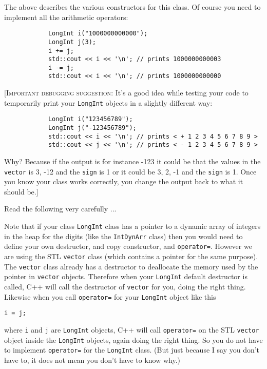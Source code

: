 The above describes the various constructors for this class. Of 
course you need to implement all the arithmetic operators:

\begin{Verbatim}
            LongInt i("1000000000000");
            LongInt j(3);
            i += j;
            std::cout << i << '\n'; // prints 1000000000003
            i -= j;
            std::cout << i << '\n'; // prints 1000000000000
\end{Verbatim}

[\textsc{Important debugging suggestion}: It's a good idea while testing your code
to temporarily print your \verb!LongInt! objects in a slightly different way:

\begin{Verbatim}
            LongInt i("123456789");
            LongInt j("-123456789");
            std::cout << i << '\n'; // prints < + 1 2 3 4 5 6 7 8 9 >
            std::cout << j << '\n'; // prints < - 1 2 3 4 5 6 7 8 9 > 
\end{Verbatim}

Why? Because if the output is for instance -123 it could be that the values 
in the \verb!vector! is 3, -12 and the \verb!sign! is 1 or it could be 3, 2, 
-1 and the \verb!sign! is 1. Once you know your class works correctly, you 
change the output back to what it should be.]

Read the following very carefully ... 

Note that if your class \verb!LongInt! class has a pointer to a dynamic 
array of integers in the heap for the digits (like the \verb!IntDynArr! 
class) then you would need to define your own destructor,
and copy constructor, and 
\verb!operator=!. However we are using the STL \verb!vector! class 
(which contains a pointer for the same purpose). The \verb!vector! 
class already has a destructor to deallocate the memory used by 
the pointer in \verb!vector! objects. Therefore when your \verb!LongInt! 
default destructor is called, C++ will call the destructor of 
\verb!vector! for you, doing the right thing. Likewise when you call 
\verb!operator=! for your \verb!LongInt! object like this
\begin{Verbatim}[frame=single,fontsize=\footnotesize]
i = j;
\end{Verbatim}
where \verb!i! and \verb!j! are \verb!LongInt! objects, C++ will call 
\verb!operator=! on the STL \verb!vector! object inside the 
\verb!LongInt! objects, again doing the right thing. So you do not 
have to implement \verb!operator=! for the \verb!LongInt! class. (But 
just because I say you don't have to, it does not mean you don't have 
to know why.)

